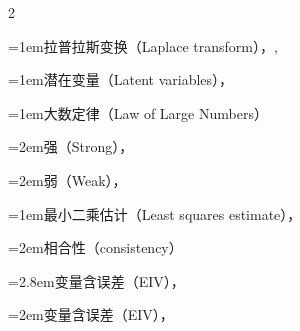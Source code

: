 \begin{multicols}{2}
\par\addvspace{2pt}
\par\noindent\hangindent=1em\hspace*{0em}\label{idx:601}拉普拉斯变换（Laplace transform），\hyperref[eq:2.3.8]{\pageref*{eq:2.3.8}}, \hyperref[idxocc:601:265]{\pageref*{idxocc:601:265}}\par
\par\addvspace{2pt}
\par\noindent\hangindent=1em\hspace*{0em}\label{idx:602}潜在变量（Latent variables），\hyperref[idxocc:602:499]{\pageref*{idxocc:602:499}}\par
\par\addvspace{2pt}
\par\noindent\hangindent=1em\hspace*{0em}\label{idx:603}大数定律（Law of Large Numbers）\par
\par\noindent\hangindent=2em\hspace*{1em}\label{idx:604}强（Strong），\hyperref[thm:5.5.9]{\pageref*{thm:5.5.9}}\par
\par\noindent\hangindent=2em\hspace*{1em}\label{idx:605}弱（Weak），\hyperref[thm:5.5.2]{\pageref*{thm:5.5.2}}\par
\par\addvspace{2pt}
\par\noindent\hangindent=1em\hspace*{0em}\label{idx:606}最小二乘估计（Least squares estimate），\hyperref[sec:11.3.1]{\pageref*{sec:11.3.1}}\par
{}
\par\noindent\hangindent=2em\hspace*{1em}\label{idx:607}相合性（consistency）\par
\par\noindent\hangindent=2.8em\hspace*{1.8em}\label{idx:608}变量含误差（EIV），\hyperref[sec:12.6.2]{\pageref*{sec:12.6.2}}\par
\par\noindent\hangindent=2em\hspace*{1em}\label{idx:609}变量含误差（EIV），\hyperref[sec:12.2.2]{\pageref*{sec:12.2.2}}\par

\end{multicols}
